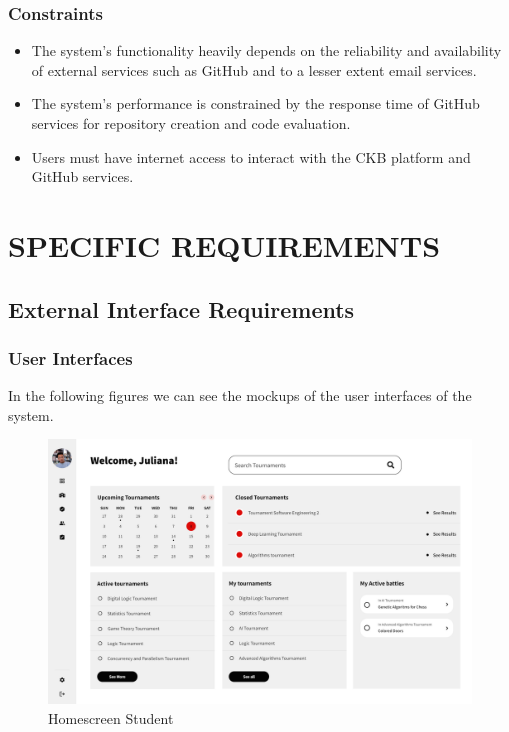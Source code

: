 \documentclass{article}
\begin{document}
\subsubsection{Constraints}

\begin{itemize}
    \item The system's functionality heavily depends on the reliability and availability of external services such as GitHub and to a lesser extent email services.
    \item The system's performance is constrained by the response time of GitHub services for repository creation and code evaluation.
    \item Users must have internet access to interact with the CKB platform and GitHub services.
\end{itemize}

\section{SPECIFIC REQUIREMENTS}
\subsection{External Interface Requirements}
\subsubsection{User Interfaces}

In the following figures we can see the mockups of the user interfaces of the system. 

\begin{figure}[!h]
    \centering
    \includegraphics[width=1\textwidth]{images/UI/Homescreen Student.png}
    \caption{Homescreen Student}
    \label{fig:HomescreenStudent}
\end{figure}
\end{document}
